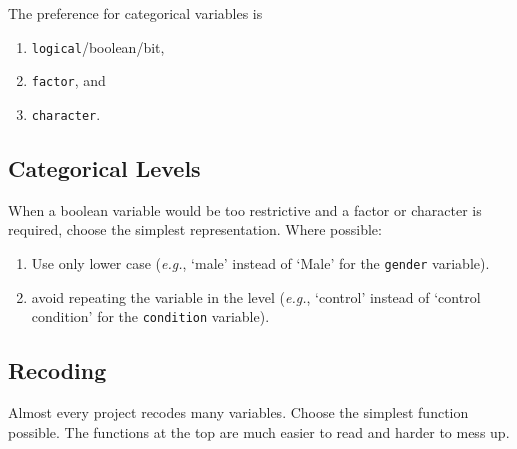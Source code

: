 \documentclass[
]{book}
\providecommand{\tightlist}{%
  \setlength{\itemsep}{0pt}\setlength{\parskip}{0pt}}
\begin{document}
The preference for categorical variables is

\begin{enumerate}
\def\labelenumi{\arabic{enumi}.}
\tightlist
\item
  \texttt{logical}/boolean/bit,
\item
  \texttt{factor}, and
\item
  \texttt{character}.
\end{enumerate}

\hypertarget{categorical-levels}{%
\subsection{Categorical Levels}\label{categorical-levels}}

When a boolean variable would be too restrictive and a factor or character is required, choose the simplest representation. Where possible:

\begin{enumerate}
\def\labelenumi{\arabic{enumi}.}
\tightlist
\item
  Use only lower case (\emph{e.g.}, `male' instead of `Male' for the \texttt{gender} variable).
\item
  avoid repeating the variable in the level (\emph{e.g.}, `control' instead of `control condition' for the \texttt{condition} variable).
\end{enumerate}

\hypertarget{recoding}{%
\subsection{Recoding}\label{recoding}}

Almost every project recodes many variables. Choose the simplest function possible. The functions at the top are much easier to read and harder to mess up.
\end{document}

